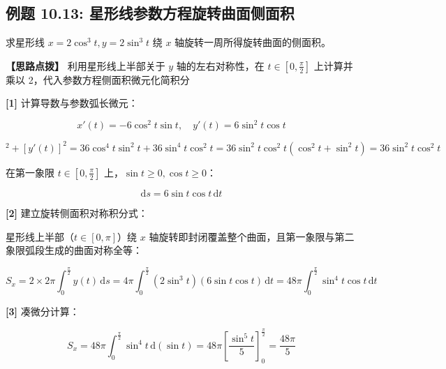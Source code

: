 \documentclass[11pt,a4paper,UTF8]{ctexart}
\begin{document}
\subsection{例题 10.13: 星形线参数方程旋转曲面侧面积}

求星形线 $x = 2\cos^3 t, y = 2\sin^3 t$ 绕 $x$ 轴旋转一周所得旋转曲面的侧面积。

\textbf{\color{DeepPurple}【思路点拨】} 利用星形线上半部关于 $y$ 轴的左右对称性，在 $t \in \left[0, \frac{\pi}{2}\right]$ 上计算并乘以 2，代入参数方程侧面积微元化简积分


\begin{solbox}[分步推导与答题规范]
\textbf{[1]} 计算导数与参数弧长微元：


\begin{equation*}
x'(t) = -6\cos^2 t\sin t, \quad y'(t) = 6\sin^2 t\cos t
\end{equation*}



\begin{equation*}
[x'(t)]^2 + [y'(t)]^2 = 36\cos^4 t\sin^2 t + 36\sin^4 t\cos^2 t = 36\sin^2 t\cos^2 t(\cos^2 t + \sin^2 t) = 36\sin^2 t\cos^2 t
\end{equation*}


在第一象限 $t \in \left[0, \frac{\pi}{2}\right]$ 上，$\sin t \geqslant 0, \cos t \geqslant 0$：


\begin{equation*}
\mathrm{d}s = 6\sin t\cos t\,\mathrm{d}t
\end{equation*}


\textbf{[2]} 建立旋转侧面积对称积分式：

星形线上半部（$t \in [0, \pi]$）绕 $x$ 轴旋转即封闭覆盖整个曲面，且第一象限与第二象限弧段生成的曲面对称全等：


\begin{equation*}
S_x = 2 \times 2\pi \int_0^{\frac{\pi}{2}} y(t)\,\mathrm{d}s = 4\pi \int_0^{\frac{\pi}{2}} (2\sin^3 t)(6\sin t\cos t)\,\mathrm{d}t = 48\pi \int_0^{\frac{\pi}{2}} \sin^4 t\cos t\,\mathrm{d}t
\end{equation*}


\textbf{[3]} 凑微分计算：


\begin{equation*}
S_x = 48\pi \int_0^{\frac{\pi}{2}} \sin^4 t\,\mathrm{d}(\sin t) = 48\pi \left[\frac{\sin^5 t}{5}\right]_0^{\frac{\pi}{2}} = \frac{48\pi}{5}
\end{equation*}

\end{solbox}
\end{document}
